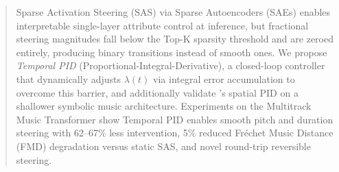 \documentclass{article}
\theoremstyle{plain}
\begin{document}

\printAffiliationsAndNotice{}

\begin{abstract}
Sparse Activation Steering (SAS) via Sparse Autoencoders (SAEs) enables interpretable single-layer attribute control at inference, but fractional steering magnitudes fall below the Top-K sparsity threshold and are zeroed entirely, producing binary transitions instead of smooth ones.
We propose \emph{Temporal PID} (Proportional-Integral-Derivative), a closed-loop controller that dynamically adjusts $\lambda(t)$ via integral error accumulation to overcome this barrier, and additionally validate \citet{nguyen2026pid}'s spatial PID on a shallower symbolic music architecture.
Experiments on the Multitrack Music Transformer show Temporal PID enables smooth pitch and duration steering with 62--67\% less intervention, 5\% reduced Fr\'{e}chet Music Distance (FMD) degradation versus static SAS, and novel round-trip reversible steering.

\end{abstract}

\end{document}

